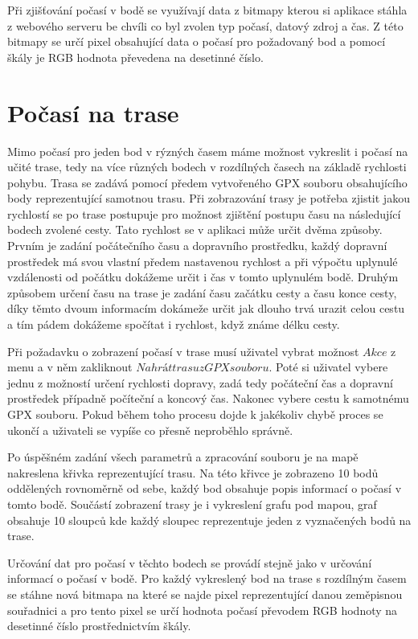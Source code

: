 \documentclass[czech,bachelor,dept460,male,csharp,cpdeclaration]{diploma}
\begin{document}
	Při zjišťování počasí v bodě se využívají data z bitmapy kterou si aplikace stáhla z webového serveru be chvíli co byl zvolen typ počasí, datový zdroj a čas. Z této bitmapy se určí pixel obsahující data o počasí pro požadovaný bod a pomocí škály je RGB hodnota převedena na desetinné číslo.
	
	\section{Počasí na trase}
	
	Mimo počasí pro jeden bod v rýzných časem máme možnost vykreslit i počasí na učité trase, tedy na více různých bodech v rozdílných časech na základě rychlosti pohybu. Trasa se zadává pomocí předem vytvořeného GPX souboru obsahujícího body reprezentující samotnou trasu. Při zobrazování trasy je potřeba zjistit jakou rychlostí se po trase postupuje pro možnost zjištění postupu času na následující bodech zvolené cesty. Tato rychlost se v aplikaci může určit dvěma způsoby. Prvním je zadání počátečního času a dopravního prostředku, každý dopravní prostředek má svou vlastní předem nastavenou rychlost a při výpočtu uplynulé vzdálenosti od počátku dokážeme určit i čas v tomto uplynulém bodě. Druhým způsobem určení času na trase je zadání času začátku cesty a času konce cesty, díky těmto dvoum informacím dokámeže určit jak dlouho trvá urazit celou cestu a tím pádem dokážeme spočítat i rychlost, když známe délku cesty.
	
	Při požadavku o zobrazení počasí v trase musí uživatel vybrat možnost $Akce$ z menu a v něm zakliknout $Nahrát trasu z GPX souboru$. Poté si uživatel vybere jednu z možností určení rychlosti dopravy, zadá tedy počáteční čas a dopravní prostředek případně počíteční a koncový čas. Nakonec vybere cestu k samotnému GPX souboru. Pokud během toho procesu dojde k jakékoliv chybě proces se ukončí a uživateli se vypíše co přesně neproběhlo správně.
	
	Po úspěšném zadání všech parametrů a zpracování souboru je na mapě nakreslena křivka reprezentující trasu. Na této křivce je zobrazeno 10 bodů oddělených rovnoměrně od sebe, každý bod obsahuje popis informací o počasí v tomto bodě. Součástí zobrazení trasy je i vykreslení grafu pod mapou, graf obsahuje 10 sloupců kde každý sloupec reprezentuje jeden z vyznačených bodů na trase. 
	
	Určování dat pro počasí v těchto bodech se provádí stejně jako v určování informací o počasí v bodě. Pro každý vykreslený bod na trase s rozdílným časem se stáhne nová bitmapa na které se najde pixel reprezentující danou zeměpisnou souřadnici a pro tento pixel se určí hodnota počasí převodem RGB hodnoty na desetinné číslo prostřednictvím škály.
	
\end{document}
